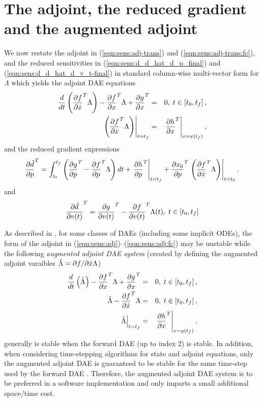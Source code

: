\documentclass[pdf,ps2pdf,11pt]{SANDreport}
\begin{document}
%
\section{The adjoint, the reduced gradient and the augmented adjoint}
%

We now restate the adjoint in (\ref{eqn:sens:adj-trans}) and
(\ref{eqn:sens:adj-trans:fc}), and the reduced sensitivities in
(\ref{eqn:sens:d_d_hat_d_p_final}) and (\ref{eqn:sens:d_d_hat_d_v_t-final}) in
standard column-wise multi-vector form for $\Lambda$ which yields the adjoint
DAE equations
%
\begin{eqnarray}
\frac{d}{dt}\left( \displaystyle{\frac{\partial f}{\partial \dot{x}}}^T \Lambda \right)
- \displaystyle{\frac{\partial f}{\partial x}}^T \Lambda + \displaystyle{\frac{\partial g}{\partial x}}^T
& = & 0, \; t \in \left[ t_0, t_f \right],
\label{eqn:sens:adj} \\
\left.\left( \displaystyle{\frac{\partial f}{\partial \dot{x}}}^T \Lambda \right)\right|_{t=t_f}
& = & \left. \displaystyle{\frac{\partial h}{\partial x}}^T \right|_{x=x(t_f)},
\label{eqn:sens:adj:fc}
\end{eqnarray}
%
and the reduced gradient expressions
%
\begin{equation}
\displaystyle{\frac{\partial \hat{d}}{\partial p}}^T =
\int_{t_0}^{t_f} \left(
    \displaystyle{\frac{\partial g}{\partial p}}^T - \displaystyle{\frac{\partial f}{\partial p}}^T \Lambda
  \right) dt
  + \left. \displaystyle{\frac{\partial h}{\partial p}}^T \right|_{t=t_f}
  +\displaystyle{\frac{\partial x_0}{\partial p}}^T \left. \left( \displaystyle{\frac{\partial f}{\partial \dot{x}}}^T \Lambda \right) \right|_{t=t_0}.
\label{eqn:sens:d_d_hat_d_p_final-2}
\end{equation}
%
and
%
\begin{equation}
\displaystyle{\frac{\partial \hat{d}}{\partial v(t)}}^T =  \displaystyle{\frac{\partial g}{\partial v(t)}}^T - \displaystyle{\frac{\partial f}{\partial v(t)}}^T \Lambda(t), \; t\in[t_0,t_f]
\label{eqn:sens:d_d_hat_d_v_t-final-2}
\end{equation}
%

As described in {}\cite{adjoint-sens-2003}, for some classes of DAEs
(including some implicit ODEs), the form of the adjoint in
(\ref{eqn:sens:adj})--(\ref{eqn:sens:adj:fc}) may be unstable while the
following {}\textit{augmented adjoint DAE system} (created by defining the
augmented adjoint varaibles $\hat{\Lambda} = \partial f / \partial \dot{x} {}\Lambda$)
%
\begin{eqnarray}
\frac{d}{dt}\left( \hat{\Lambda} \right)
-  \displaystyle{\frac{\partial f}{\partial x}}^T \Lambda + \displaystyle{\frac{\partial g}{\partial x}}^T
& = & 0, \; t \in \left[ t_0, t_f \right],
\label{eqn:sens:aug-adj-de} \\
\hat{\Lambda} - \displaystyle{\frac{\partial f}{\partial \dot{x}}}^T \Lambda
& = & 0, \; t \in \left[ t_0, t_f \right],
\label{eqn:sens:aug-adj-ae} \\
\left. \hat{\Lambda} \right|_{t=t_f}
& = & \left. \displaystyle{\frac{\partial h}{\partial x}}^T \right|_{x=y(t_f)},
\label{eqn:sens:aug-adj:fc}
\end{eqnarray}
%
generally is stable when the forward DAE (up to index 2) is stable.  In
addition, when considering time-stepping algorithms for state and adjoint
equations, only the augmented adjoint DAE is guaranteed to be stable for the
same time-step used by the forward DAE {}\cite{adjoint-sens-2003}.  Therefore,
the augmented adjoint DAE system is to be preferred in a software
implementation and only imparts a small additional space/time cost.
\end{document}
